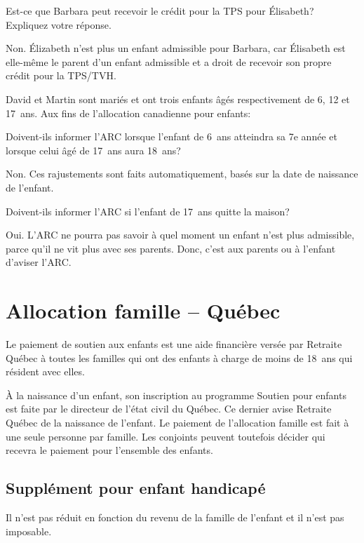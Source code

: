 \begin{sousQuestion}
	Est-ce que Barbara peut recevoir le crédit pour la TPS pour Élisabeth? Expliquez votre réponse.
\end{sousQuestion}
Non. Élizabeth n'est plus un enfant admissible pour Barbara, car Élisabeth est elle-même le parent d'un enfant admissible et a droit de recevoir son propre crédit pour la TPS/TVH.

\begin{question}
	David et Martin sont mariés et ont trois enfants âgés respectivement de 6, 12 et 17~ans. Aux fins de l'allocation canadienne pour enfants:
\end{question}
\setcounter{sousQuestion}{0}
\begin{sousQuestion}
	Doivent-ils informer l'ARC lorsque l'enfant de 6~ans atteindra sa 7e année et lorsque celui âgé de 17~ans aura 18~ans?
\end{sousQuestion}
Non. Ces rajustements sont faits automatiquement, basés sur la date de naissance de l'enfant.

\begin{sousQuestion}
	Doivent-ils informer l'ARC si l'enfant de 17~ans quitte la maison?
\end{sousQuestion}
Oui. L'ARC ne pourra pas savoir à quel moment un enfant n'est plus admissible, parce qu'il ne vit plus avec ses parents. Donc, c'est aux parents ou à l'enfant d'aviser l'ARC.



\section{Allocation famille -- Québec}
\begin{intro}
	Le paiement de soutien aux enfants est une aide financière versée par Retraite Québec à toutes les familles qui ont des enfants à charge de moins de 18~ans qui résident avec elles.
\end{intro}

À la naissance d'un enfant, son inscription au programme \og Soutien pour enfants \fg{} est faite par le directeur de l'état civil du Québec. Ce dernier avise Retraite Québec de la naissance de l'enfant. Le paiement de l'allocation famille est fait à une seule personne par famille. Les conjoints peuvent toutefois décider qui recevra le paiement pour l'ensemble des enfants. 


\subsection{Supplément pour enfant handicapé}
Il n'est pas réduit en fonction du revenu de la famille de l'enfant et il n'est pas imposable.

